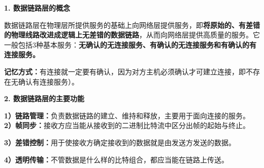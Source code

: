 \textbf{{1. 数据链路层的概念}}

数据链路层在物理层所提供服务的基础上向网络层提供服务，即\textbf{将原始的、有差错的物理线路改进成逻辑上无差错的数据链路}，从而向网络层提供高质量的服务。它一般包括3种基本服务：\textbf{无确认的无连接服务、有确认的无连接服务和有确认的有连接服务。}

{\textbf{{记忆方式：}}有连接就一定要有确认，因为对方主机必须确认才可建立连接，即不存在无确认有连接服务）。}

\textbf{{2. 数据链路层的主要功能}}

\textbf{1）链路管理：}负责数据链路的建立、维持和释放，主要用于面向连接的服务。\\

\textbf{2）帧同步：}接收方应当能从接收到的二进制比特流中区分出帧的起始与终止。

\textbf{3）差错控制：}用于使接收方确定接收到的数据就是由发送方发送的数据。

\textbf{4）透明传输：}不管数据是什么样的比特组合，都应当能在链路上传送。
